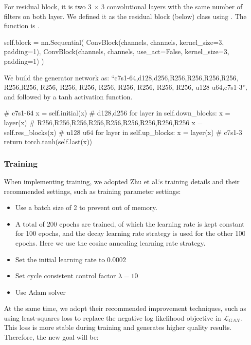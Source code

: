 For residual block, it is two 3 $\times$ 3 convolutional layers with the same number of filters on both layer. We defined it as the residual block (below) class using . The  function is .

\begin{python}
self.block = nn.Sequential(
    ConvBlock(channels,
              channels, 
              kernel_size=3, 
              padding=1),
    ConvBlock(channels, 
              channels, 
              use_act=False, 
              kernel_size=3, 
              padding=1)
)
\end{python}

We build the generator network as: ``c7s1-64,d128,d256,R256,R256,R256,R256, R256,R256, R256, R256, R256, R256, R256, R256, R256, R256, u128
u64,c7s1-3'', and followed by a tanh activation function.

\begin{python}
# c7s1-64
x = self.initial(x)
# d128,d256
for layer in self.down_blocks:
    x = layer(x)
# R256,R256,R256,R256,R256,R256,R256,R256,R256
x = self.res_blocks(x)
# u128 u64
for layer in self.up_blocks:
    x = layer(x)
# c7s1-3
return torch.tanh(self.last(x))
\end{python}

\subsubsection{Training}
When implementing training, we adopted Zhu et al.`s training details and their recommended settings, such as training parameter settings:

\begin{itemize}
    \item Use a batch size of 2 to prevent out of memory.
    \item A total of 200 epochs are trained, of which the learning rate is kept constant for 100 epochs, and the decay learning rate strategy is used for the other 100 epochs. Here we use the cosine annealing learning rate strategy.
    \item Set the initial learning rate to 0.0002
    \item Set cycle consistent control factor $\lambda = 10$
    \item Use Adam solver
\end{itemize}

At the same time, we adopt their recommended improvement techniques, such as using least-squares loss to replace the negative log likelihood objective in $\mathcal{L}_{GAN}$. This loss is more stable during training and generates higher quality results. Therefore, the new goal will be:


